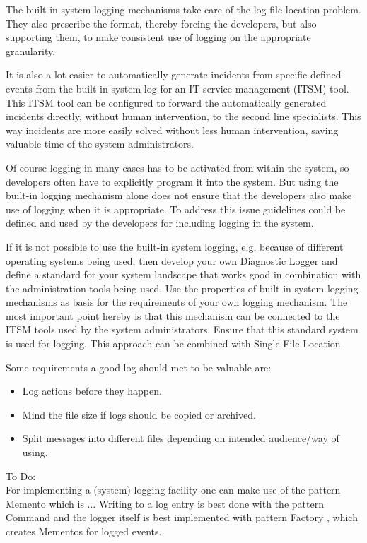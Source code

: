 The built-in system logging mechanisms take care of the log file location problem. They also prescribe the format, thereby forcing the developers, but also supporting them, to make consistent use of logging on the appropriate granularity.

It is also a lot easier to automatically generate incidents from specific defined events from the built-in system log for an IT service management (ITSM) tool. This ITSM tool can be configured to forward the automatically generated incidents directly, without human intervention, to the second line specialists. This way incidents are more easily solved without less human intervention, saving valuable time of the system administrators.

Of course logging in many cases has to be activated from within the system, so developers often have to explicitly program it into the system. But using the built-in logging mechanism alone does not ensure that the developers also make use of logging when it is appropriate. To address this issue guidelines could be defined and used by the developers for including logging in the system. 

If it is not possible to use the built-in system logging, e.g. because of different operating systems being used, then develop your own {\sc Diagnostic Logger} \cite{Harrison2001} and define a standard for your system landscape that works good in combination with the administration tools being used. Use the properties of built-in system logging mechanisms as basis for the requirements of your own logging mechanism. The most important point hereby is that this mechanism can be connected to the ITSM tools used by the system administrators. Ensure that this standard system is used for logging. This approach can be combined with {\sc Single File Location}.

Some requirements a good log should met to be valuable are:
\begin{itemize}
	\item Log actions before they happen.
	\item Mind the file size if logs should be copied or archived.
	\item Split messages into different files depending on intended audience/way of using.
\end{itemize}


To Do: \\
For implementing a (system) logging facility one can make use of the  pattern {\sc Memento} \cite{Gamma95} which is ... Writing to a log entry is best done with the pattern {\sc Command} \cite{Gamma95} and the logger itself is best implemented with pattern {\sc Factory} \cite{Gamma95}, which creates Mementos for logged events.

